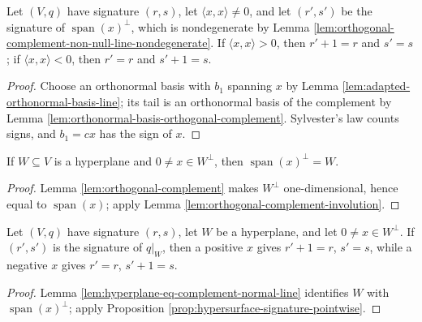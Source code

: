 \begin{proposition}
\label{prop:hypersurface-signature-pointwise}
\leanok
{}
Let $(V,q)$ have signature $(r,s)$, let $\langle x,x\rangle\ne0$, and let $(r',s')$ be the signature of $\operatorname{span}(x)^\perp$, which is nondegenerate by Lemma \ref{lem:orthogonal-complement-non-null-line-nondegenerate}. If $\langle x,x\rangle>0$, then $r'+1=r$ and $s'=s$; if $\langle x,x\rangle<0$, then $r'=r$ and $s'+1=s$.
\end{proposition}
\begin{proof}
\leanok
{}
\sketch Choose an orthonormal basis with $b_1$ spanning $x$ by Lemma \ref{lem:adapted-orthonormal-basis-line}; its tail is an orthonormal basis of the complement by Lemma \ref{lem:orthonormal-basis-orthogonal-complement}. Sylvester's law counts signs, and $b_1=cx$ has the sign of $x$.
\end{proof}

\begin{lemma}
\label{lem:hyperplane-eq-complement-normal-line}
\leanok
{}
If $W\subseteq V$ is a hyperplane and $0\ne x\in W^\perp$, then $\operatorname{span}(x)^\perp=W$.
\end{lemma}
\begin{proof}
\leanok
{}
\sketch Lemma \ref{lem:orthogonal-complement} makes $W^\perp$ one-dimensional, hence equal to $\operatorname{span}(x)$; apply Lemma \ref{lem:orthogonal-complement-involution}.
\end{proof}

\begin{proposition}
\label{prop:hypersurface-signature-pointwise-hyperplane}
\leanok
{}
Let $(V,q)$ have signature $(r,s)$, let $W$ be a hyperplane, and let $0\ne x\in W^\perp$. If $(r',s')$ is the signature of $q|_W$, then a positive $x$ gives $r'+1=r$, $s'=s$, while a negative $x$ gives $r'=r$, $s'+1=s$.
\end{proposition}
\begin{proof}
\leanok
{}
\sketch Lemma \ref{lem:hyperplane-eq-complement-normal-line} identifies $W$ with $\operatorname{span}(x)^\perp$; apply Proposition \ref{prop:hypersurface-signature-pointwise}.
\end{proof}

